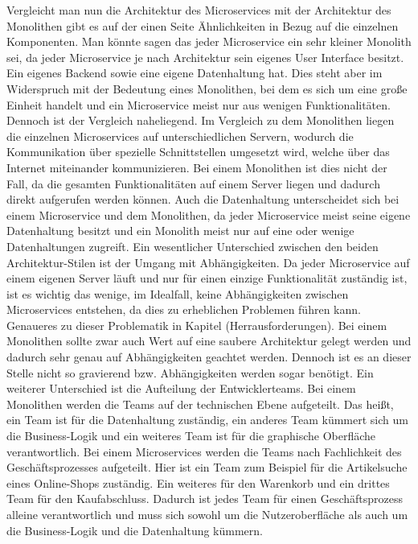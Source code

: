 Vergleicht man nun die Architektur des Microservices mit der Architektur des Monolithen gibt es auf der einen Seite Ähnlichkeiten in Bezug auf die einzelnen Komponenten.\newline
Man könnte sagen das jeder Microservice ein sehr kleiner Monolith sei, da jeder Microservice je nach Architektur sein eigenes User Interface besitzt. Ein eigenes Backend sowie eine eigene Datenhaltung hat. Dies steht aber im Widerspruch mit der Bedeutung eines Monolithen, bei dem es sich um eine große Einheit handelt und ein Microservice meist nur aus wenigen Funktionalitäten. Dennoch ist der Vergleich naheliegend.\newline
Im Vergleich zu dem Monolithen liegen die einzelnen Microservices auf unterschiedlichen Servern, wodurch die Kommunikation über spezielle Schnittstellen umgesetzt wird, welche über das Internet miteinander kommunizieren. Bei einem Monolithen ist dies nicht der Fall, da die gesamten Funktionalitäten auf einem Server liegen und dadurch direkt aufgerufen werden können. Auch die Datenhaltung unterscheidet sich bei einem Microservice und dem Monolithen, da jeder Microservice meist seine eigene Datenhaltung besitzt und ein Monolith meist nur auf eine oder wenige Datenhaltungen zugreift.\newline
Ein wesentlicher Unterschied zwischen den beiden Architektur-Stilen ist der Umgang mit Abhängigkeiten. Da jeder Microservice auf einem eigenen Server läuft und nur für einen einzige Funktionalität zuständig ist, ist es wichtig das wenige, im Idealfall, keine Abhängigkeiten zwischen Microservices entstehen, da dies zu erheblichen Problemen führen kann. Genaueres zu dieser Problematik in Kapitel (Herrausforderungen).\newline
Bei einem Monolithen sollte zwar auch Wert auf eine saubere Architektur gelegt werden und dadurch sehr genau auf Abhängigkeiten geachtet werden. Dennoch ist es an dieser Stelle nicht so gravierend bzw. Abhängigkeiten werden sogar benötigt. 
Ein weiterer Unterschied ist die Aufteilung der Entwicklerteams. Bei einem Monolithen werden die Teams auf der technischen Ebene aufgeteilt. Das heißt, ein Team ist für die Datenhaltung zuständig, ein anderes Team kümmert sich um die Business-Logik und ein weiteres Team ist für die graphische Oberfläche verantwortlich.\newline
Bei einem Microservices werden die Teams nach Fachlichkeit des Geschäftsprozesses aufgeteilt. \newline
Hier ist ein Team zum Beispiel für die Artikelsuche eines Online-Shops zuständig. Ein weiteres für den Warenkorb und ein drittes Team für den Kaufabschluss. Dadurch ist jedes Team für einen Geschäftsprozess alleine verantwortlich und muss sich sowohl um die Nutzeroberfläche als auch um die Business-Logik und die Datenhaltung kümmern.


